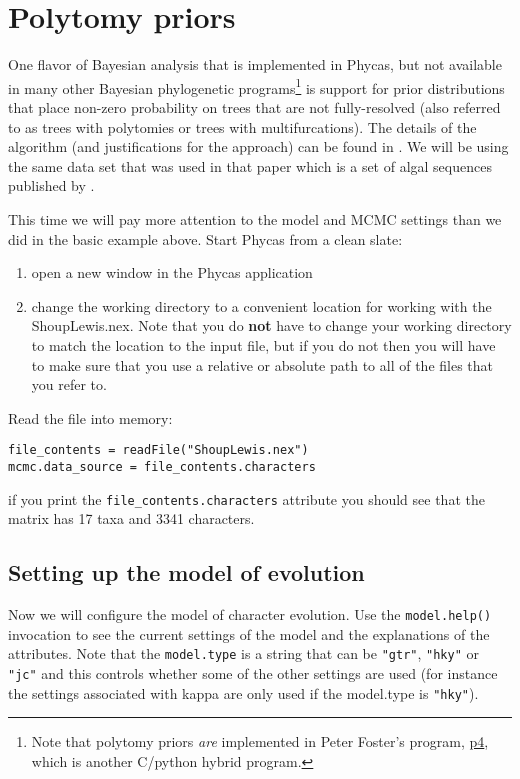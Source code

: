\documentclass{article}
\newcommand{\cmd}[1]{\texttt{#1}\xspace}
\newcommand{\phycas}{Phycas\xspace}
\newcommand{\localfile}[1]{\textsf{#1}\xspace}
\begin{document}



\section{Polytomy priors}
One flavor of Bayesian analysis that is implemented in \phycas, but not available in many other Bayesian phylogenetic programs\footnote{Note that polytomy priors {\em are} implemented in Peter Foster's program, \href{http://bmnh.org/~pf/p4.html}{p4}, which is another C/python hybrid program.} is support for prior distributions that place non-zero probability on trees that are not fully-resolved (also referred to as trees with polytomies or trees with multifurcations).
The details of the algorithm (and justifications for the approach) can be found in \citet{LewisHH2005}.
We will be using the same data set that was used in that paper which is a set of algal sequences published by \citet{ShoupL2003}.

This time we will pay more attention to the model and MCMC settings than we did in the basic example above.
Start \phycas from a clean slate:
\begin{enumerate}
	\item open a new window in the \phycas application
	\item change the working directory to a convenient location for working with the \localfile{ShoupLewis.nex}. Note that you do {\bf not} have to change your working directory to match the location to the input file, but if you do not then you will have to make sure that you use a relative or absolute path to all of the files that you refer to.
\end{enumerate}

Read the file into memory:
\begin{verbatim}
file_contents = readFile("ShoupLewis.nex")
mcmc.data_source = file_contents.characters
\end{verbatim}
if you print the \cmd{file\_contents.characters} attribute you should see that the matrix has 17 taxa and 3341 characters.

\subsection{Setting up the model of evolution}
Now we will configure the model of character evolution. 
Use the \cmd{model.help()} invocation to see the current settings of the model and the explanations of the
attributes.
Note that the \cmd{model.type} is a string that can be \texttt{"gtr"}, \texttt{"hky"} or \texttt{"jc"} and this controls whether some of the other settings are used (for instance the settings associated with kappa are only used if the model.type is \texttt{"hky"}).
\end{document}
